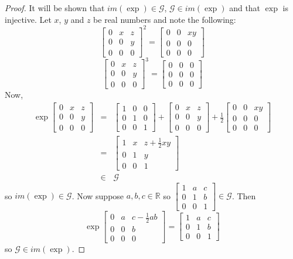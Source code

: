 \documentclass[honours]{UNSWthesis}
\newcommand{\R}{\mathbb{R}}
\newcommand{\G}{\mathcal{G}}
\newcommand{\1}{\mathbf{e}_{1}}
\newcommand{\2}{\mathbf{e}_{3}}
\newcommand{\3}{\mathbf{e}_{3}}
\begin{document}
\begin{proof}
It will be shown that $im(\exp) \in \G$, $\G \in im(\exp)$ and that $\exp$ is injective. 
Let $x$, $y$ and $z$ be real numbers and note the following: 
\[
\begin{bmatrix} 0 & x & z \\ 0 & 0 & y \\ 0 & 0 & 0 \end{bmatrix}^2=\begin{bmatrix} 0 & 0 & xy \\ 0 & 0 & 0 \\ 0 & 0 & 0 \end{bmatrix}
\]
\[
\begin{bmatrix} 0 & x & z \\ 0 & 0 & y \\ 0 & 0 & 0 \end{bmatrix}^3=\begin{bmatrix} 0 & 0 & 0 \\ 0 & 0 & 0 \\ 0 & 0 & 0 \end{bmatrix}
\]
Now,
\begin{eqnarray*}
 \exp \begin{bmatrix} 0 & x & z \\ 0 & 0 & y \\ 0 & 0 & 0 \end{bmatrix} &=& \begin{bmatrix} 1 & 0 & 0 \\ 0 & 1 & 0 \\ 0 & 0 & 1 \end{bmatrix} + \begin{bmatrix} 0 & x & z \\ 0 & 0 & y \\ 0 & 0 & 0 \end{bmatrix}+ \frac{1}{2}\begin{bmatrix} 0 & 0 & xy \\ 0 & 0 & 0 \\ 0 & 0 & 0 \end{bmatrix} \\
&=& \begin{bmatrix} 1 & x & z+\frac{1}{2}xy \\ 0 & 1 & y \\ 0 & 0 & 1 \end{bmatrix} \\
&\in & \G
\end{eqnarray*} so $ im(\exp) \in \G$.
Now suppose $a,b,c \in \R$ so $\begin{bmatrix} 1 & a & c \\ 0 & 1 & b \\ 0 & 0 & 1 \end{bmatrix} \in \G$. Then 
\[ 
\exp  \begin{bmatrix} 0 & a & c-\frac{1}{2}ab \\ 0 & 0 & b \\ 0 & 0 & 0 \end{bmatrix} = \begin{bmatrix} 1 & a & c \\ 0 & 1 & b \\ 0 & 0 & 1 \end{bmatrix}
\]
so $\G \in im(\exp)$.


\end{proof}
\end{document}
